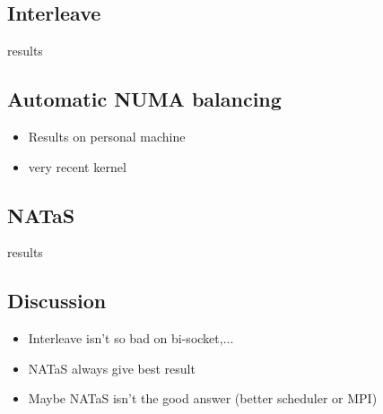 \documentclass[oneside,12t]{classes/Thesis}
\begin{document}
\subsection{Interleave}
results
\subsection{Automatic NUMA balancing}
  \begin{itemize}
    \item Results on personal machine
    \item very recent kernel
  \end{itemize}
\subsection{NATaS}
results
\subsection{Discussion}
  \begin{itemize}
    \item Interleave isn't so bad on bi-socket,...
    \item NATaS always give best result
    \item Maybe NATaS isn't the good answer (better scheduler or MPI)
  \end{itemize}


\end{document}
